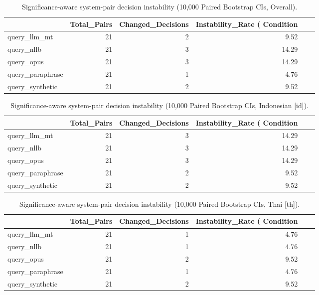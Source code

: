 \begin{table}
\caption{Significance-aware system-pair decision instability (10,000 Paired Bootstrap CIs, Overall).}
\label{tab:pairwise_significance_instability_overall}
\begin{tabular}{lrrr}
\toprule
 & Total_Pairs & Changed_Decisions & Instability_Rate (%
Condition &  &  &  \\
\midrule
query_llm_mt & 21 & 2 & 9.52 \\
query_nllb & 21 & 3 & 14.29 \\
query_opus & 21 & 3 & 14.29 \\
query_paraphrase & 21 & 1 & 4.76 \\
query_synthetic & 21 & 2 & 9.52 \\
\bottomrule
\end{tabular}
\end{table}


\begin{table}
\caption{Significance-aware system-pair decision instability (10,000 Paired Bootstrap CIs, Indonesian [id]).}
\label{tab:pairwise_significance_instability_id}
\begin{tabular}{lrrr}
\toprule
 & Total_Pairs & Changed_Decisions & Instability_Rate (%
Condition &  &  &  \\
\midrule
query_llm_mt & 21 & 3 & 14.29 \\
query_nllb & 21 & 3 & 14.29 \\
query_opus & 21 & 3 & 14.29 \\
query_paraphrase & 21 & 2 & 9.52 \\
query_synthetic & 21 & 2 & 9.52 \\
\bottomrule
\end{tabular}
\end{table}


\begin{table}
\caption{Significance-aware system-pair decision instability (10,000 Paired Bootstrap CIs, Thai [th]).}
\label{tab:pairwise_significance_instability_th}
\begin{tabular}{lrrr}
\toprule
 & Total_Pairs & Changed_Decisions & Instability_Rate (%
Condition &  &  &  \\
\midrule
query_llm_mt & 21 & 1 & 4.76 \\
query_nllb & 21 & 1 & 4.76 \\
query_opus & 21 & 2 & 9.52 \\
query_paraphrase & 21 & 1 & 4.76 \\
query_synthetic & 21 & 2 & 9.52 \\
\bottomrule
\end{tabular}
\end{table}



